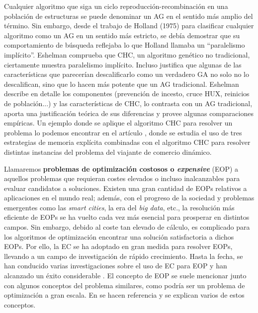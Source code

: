 
Cualquier algoritmo que siga un ciclo reproducción-recombinación en una población de estructuras se puede denominar un AG en el sentido más amplio del término. 
Sin embargo, desde el trabajo de Holland (1975) 
para clasificar cualquier algoritmo como un AG en un sentido más estricto, se debía demostrar que su comportamiento de búsqueda reflejaba lo que Holland llamaba un ``paralelismo implícito''. 
Eshelman \parencite{eshelmanCHCAdaptiveSearch1991a} comprueba que CHC, un algoritmo genético no tradicional, ciertamente muestra paralelismo implícito. 
Incluso justifica que algunas de las características que parecerían descalificarlo como un verdadero GA no solo no lo descalifican, sino que lo hacen más potente que un AG tradicional.  
Eshelman describe en detalle los componentes (prevención de incesto, cruce HUX, reinicios de población...) y las características de CHC, lo contrasta con un AG tradicional, aporta una justificación teórica de sus diferencias y provee algunas comparaciones empíricas. 
Un ejemplo donde se aplique el algoritmo CHC para resolver un problema lo podemos encontrar en el artículo \parencite{simoesCHCBasedAlgorithmsDynamic2011}, donde se estudia el uso de tres estrategias de memoria explícita combinadas con el algoritmo CHC para resolver distintas instancias del problema del viajante de comercio dinámico. 


Llamaremos \textbf{problemas de optimización costosos o \textit{expensive}} (EOP) a aquellos problemas que requieran costes elevados o incluso inalcanzables para evaluar candidatos a soluciones. 
Existen una gran cantidad de EOPs relativos a aplicaciones en el mundo real; además, con el progreso de la sociedad y problemas emergentes como las \textit{smart cities}, la era del \textit{big data}, etc., la resolución más eficiente de EOPs se ha vuelto cada vez más esencial para prosperar en distintos campos. 
Sin embargo, debido al coste tan elevado de cálculo, es complicado para los algoritmos de optimización encontrar una solución satisfactoria a dichos EOPs. 
Por ello, la EC se ha adoptado en gran medida para resolver EOPs, llevando a un campo de investigación de rápido crecimiento. 
Hasta la fecha, se han conducido varias investigaciones sobre el uso de EC para EOP y han alcanzado un éxito considerable \parencite{liEvolutionaryComputationExpensive2022} \parencite{jinComprehensiveSurveyFitness2005} \parencite{shanSurveyModelingOptimization2010} \parencite{tenneComputationalIntelligenceExpensive2010}.
El concepto de EOP se suele mencionar junto con algunos conceptos del problema similares, como podría ser un problema de optimización a gran escala. 
En \parencite{liEvolutionaryComputationExpensive2022} se hacen referencia y se explican varios de estos conceptos. 

